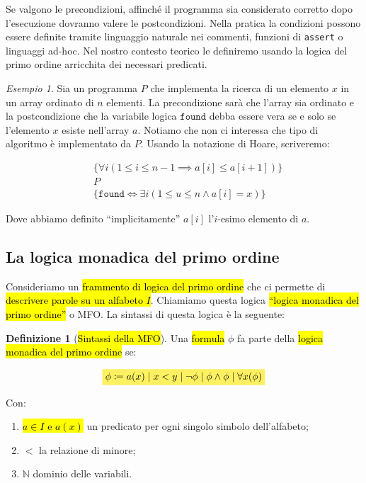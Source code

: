 \documentclass[a4paper,11pt,oneside]{article}
\theoremstyle{plain}
\theoremstyle{definition}
\newtheorem{defn}{Definizione}[section]
\theoremstyle{remark}
\newtheorem{esempio}{Esempio}[section]
\newcommand{\mhl}[1]{\colorbox{hlcolor}{$\displaystyle #1$}}
\begin{document}
Se valgono le precondizioni, affinché il programma sia considerato corretto
dopo l'esecuzione dovranno valere le postcondizioni. Nella pratica la condizioni
possono essere definite tramite linguaggio naturale nei commenti, funzioni di
\texttt{assert} o linguaggi ad-hoc. Nel nostro contesto teorico le definiremo
usando la logica del primo ordine arricchita dei necessari predicati.

\begin{esempio}
  Sia un programma $P$ che implementa la ricerca di un
  elemento $x$ in un array ordinato di $n$ elementi. La precondizione sarà che
  l'array sia ordinato e la postcondizione che la variabile logica
  $\mathtt{found}$ debba essere vera se e solo se l'elemento $x$ esiste
  nell'array $a$. Notiamo che non ci interessa che tipo di algoritmo è
  implementato da $P$. Usando la notazione di Hoare, scriveremo:

  \[
    \begin{aligned}
      & \{ \forall i (1 \leq i \leq n-1 \implies a[i] \leq a[i+1] ) \} \\
      & P \\
      & \{ \mathtt{found} \iff \exists i (1 \leq u \leq n \land a[i] = x ) \}
    \end{aligned}
  \]

  Dove abbiamo definito ``implicitamente'' $a[i]$ l'$i$-esimo elemento di $a$.
\end{esempio}

\subsection{La logica monadica del primo ordine}\label{sec:mfo}

Consideriamo un \hl{frammento di logica del primo ordine} che ci permette di
\hl{descrivere parole su un alfabeto $I$}. Chiamiamo questa logica \hl{``logica
monadica del primo ordine''} o MFO\@. La sintassi di questa logica è la
seguente:

\begin{defn}[\hl{Sintassi della MFO}]\label{def:mfo-sintassi}
  Una \hl{formula} $\phi$ fa parte della \hl{logica monadica del primo ordine}
  se:

  \begin{equation}
    \mhl{
    \phi\coloneqq a(x) \mid x < y \mid\neg\phi\mid\phi\land\phi\mid\forall x(\phi)
    }
  \end{equation}

  Con:
  \begin{enumerate}
    \item \hl{$a \in I$ e $a(x)$} un predicato per ogni singolo simbolo
      dell'alfabeto;
    \item $<$ la relazione di minore;
    \item $\mathbb{N}$ dominio delle variabili.
  \end{enumerate}
\end{defn}
\end{document}
